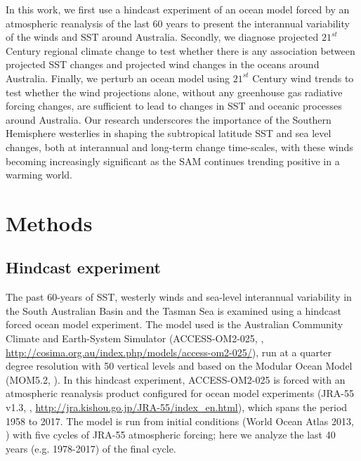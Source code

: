 \documentclass[draft,linenumbers]{agujournal2018}
\begin{document}
In this work, we first use a hindcast experiment of an ocean model forced by an atmospheric reanalysis of the last 60 years to present the interannual variability of the winds and SST around Australia. Secondly, we diagnose projected $21^{st}$ Century regional climate change to test whether there is any association between projected SST changes and projected wind changes in the oceans around Australia. Finally, we perturb an ocean model using $21^{st}$ Century wind trends to test whether the wind projections alone, without any greenhouse gas radiative forcing changes, are sufficient to lead to changes in SST and oceanic processes around Australia. Our research underscores the importance of the Southern Hemisphere westerlies in shaping the subtropical latitude SST and sea level changes, both at interannual and long-term change time-scales, with these winds becoming increasingly significant as the SAM continues trending positive in a warming world.



\section{Methods}
\subsection{Hindcast experiment}
The past 60-years of SST, westerly winds and sea-level interannual variability in the South Australian Basin and the Tasman Sea is examined using a hindcast forced ocean model experiment. The model used is the Australian Community Climate and Earth-System Simulator (ACCESS-OM2-025, \citealp{Bi2012}, \url{http://cosima.org.au/index.php/models/access-om2-025/}), run at a quarter degree resolution with 50 vertical levels and based on the Modular Ocean Model (MOM5.2, \citealp{Griffies2012}). In this hindcast experiment, ACCESS-OM2-025 is forced with an atmospheric reanalysis product configured for ocean model experiments (JRA-55 v1.3, \citealp{Kobayashi2015}, \url{http://jra.kishou.go.jp/JRA-55/index_en.html}), which spans the period 1958 to 2017. The model is run from initial conditions (World Ocean Atlas 2013, \citealp{Boyer2013}) with five cycles of JRA-55 atmospheric forcing; here we analyze the last 40 years (e.g. 1978-2017) of the final cycle.
\end{document}
